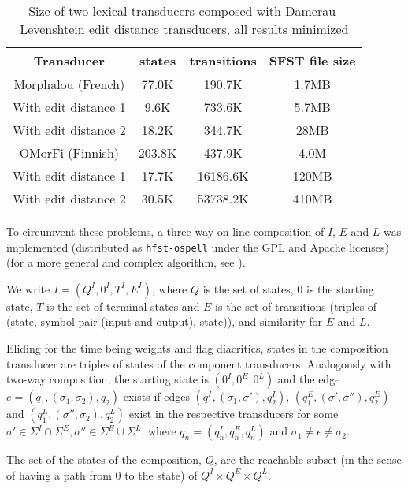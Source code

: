 \documentclass{llncs}
\begin{document}
\begin{table}
  \centering
  \caption{Size of two lexical transducers composed with
    Damerau-Levenshtein edit distance transducers, all results minimized}
  \label{composed_error_table}
  \begin{tabular}{ |c| c c c| }
    \hline
    Transducer               & states   & transitions & SFST file size \\ \hline
    Morphalou (French)       & 77.0K    & 190.7K   & 1.7MB \\
    With edit distance 1     & 9.6K     & 733.6K   & 5.7MB \\
    With edit distance 2     & 18.2K    & 344.7K  & 28MB \\ \hline
    OMorFi (Finnish)         & 203.8K   & 437.9K   & 4.0M \\
    With edit distance 1     & 17.7K    & 16186.6K & 120MB \\
    With edit distance 2     & 30.5K    & 53738.2K & 410MB \\ \hline
  \end{tabular}

\end{table}

To circumvent these problems, a three-way on-line composition of $I$, $E$ and
$L$ was implemented (distributed as \verb!hfst-ospell!
under the GPL and Apache licenses) (for a more general and complex algorithm,
see \cite{allauzen/2009}).

We write $I = (Q^I, 0^I, T^I, E^I)$, where $Q$
is the set of states, $0$ is the starting state, $T$ is the set of terminal
states and $E$ is the set of transitions (triples of (state, symbol pair
(input and output), state)), and similarity for $E$ and $L$.

Eliding for the time being weights and flag diacritics, states in the
composition transducer are triples of states of the component transducers.
Analogously with two-way composition, the starting state is $(0^I, 0^E, 0^L)$
and the edge $e = (q_1, (\sigma_1, \sigma_2), q_2)$ exists if edges
$(q^I_1, (\sigma_1, \sigma'), q^I_2)$,
$(q^E_1, (\sigma', \sigma''), q^E_2)$ and
$(q^L_1, (\sigma'', \sigma_2), q^L_2)$ exist in the respective transducers
for some
$\sigma' \in \Sigma^I \cap \Sigma^E, \sigma'' \in \Sigma^E \cup \Sigma^L$,
where $q_n = (q^I_n, q^E_n, q^L_n)$ and $\sigma_1 \neq \epsilon \neq \sigma_2$.

The set of the states of the composition, $Q$, are the reachable subset
(in the sense of having a path from $0$ to the state) of
$Q^I \times Q^E \times Q^L$.
\end{document}
